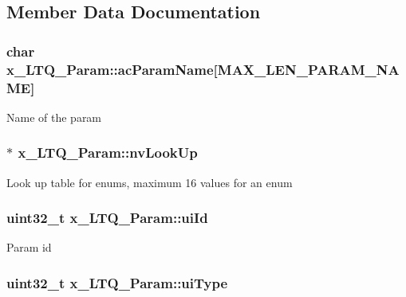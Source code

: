 \subsection{Member Data Documentation}
\hypertarget{structx__LTQ__Param_a6023ecf10fd4bdcafa9c291a29229355}{
\subsubsection[{ac\-Param\-Name}]{\setlength{\rightskip}{0pt plus 5cm}char x\-\_\-\-L\-T\-Q\-\_\-\-Param\-::ac\-Param\-Name\mbox{[}{\bf M\-A\-X\-\_\-\-L\-E\-N\-\_\-\-P\-A\-R\-A\-M\-\_\-\-N\-A\-M\-E}\mbox{]}}}\label{structx__LTQ__Param_a6023ecf10fd4bdcafa9c291a29229355}
Name of the param \hypertarget{structx__LTQ__Param_a8353f8dff855f22890e656ef2683cf14}{
\subsubsection[{nv\-Look\-Up}]{$\ast$ x\-\_\-\-L\-T\-Q\-\_\-\-Param\-::nv\-Look\-Up}}\label{structx__LTQ__Param_a8353f8dff855f22890e656ef2683cf14}
Look up table for enums, maximum 16 values for an enum \hypertarget{structx__LTQ__Param_abefad4567c0bd0638661ab6c294ba978}{
\subsubsection[{ui\-Id}]{\setlength{\rightskip}{0pt plus 5cm}uint32\-\_\-t x\-\_\-\-L\-T\-Q\-\_\-\-Param\-::ui\-Id}}\label{structx__LTQ__Param_abefad4567c0bd0638661ab6c294ba978}
Param id \hypertarget{structx__LTQ__Param_a6418a8dffa891b6afd5caad55569b076}{
\subsubsection[{ui\-Type}]{\setlength{\rightskip}{0pt plus 5cm}uint32\-\_\-t x\-\_\-\-L\-T\-Q\-\_\-\-Param\-::ui\-Type}}\label{structx__LTQ__Param_a6418a8dffa891b6afd5caad55569b076}
